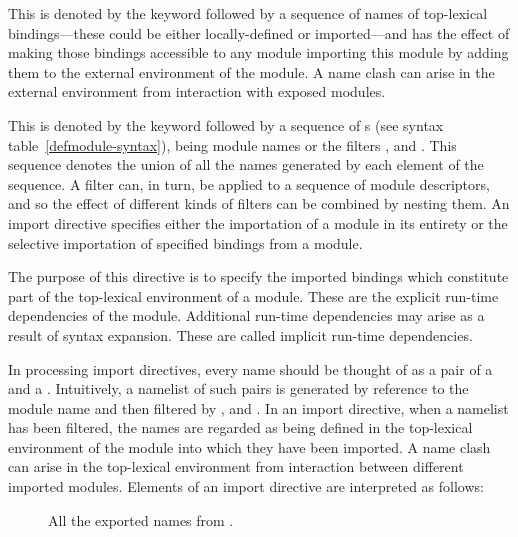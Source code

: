 %
%
\begin{optDefinition}
This is denoted by the keyword  followed by a sequence of
names of top-lexical bindings---these could be either locally-defined or
imported---and has the effect of making those bindings accessible to any module
importing this module by adding them to the external environment of the module.
A name clash can arise in the external environment from interaction with exposed
modules.
\end{optDefinition}
%
%
\label{import}
%
\begin{optDefinition}
This is denoted by the keyword  followed by a sequence of
s (see syntax table~\ref{defmodule-syntax}), being
module names or the filters ,  and
.  This sequence denotes the union of all the names generated
by each element of the sequence.  A filter can, in turn, be applied to a
sequence of module descriptors, and so the effect of different kinds of filters
can be combined by nesting them.  An import directive specifies either the
importation of a module in its entirety or the selective importation of
specified bindings from a module.

The purpose of this directive is to specify the imported bindings which
constitute part of the top-lexical environment of a module.  These are the
explicit run-time dependencies of the module.  Additional run-time dependencies
may arise as a result of syntax expansion.  These are called implicit run-time
dependencies.

In processing import directives, every name should be thought of as a pair of a
 and a .  Intuitively, a namelist of such
pairs is generated by reference to the module name and then filtered by
,  and .  In an import
directive, when a namelist has been filtered, the names are regarded as being
defined in the top-lexical environment of the module into which they have been
imported.  A name clash can arise in the top-lexical environment from
interaction between different imported modules.  Elements of an import directive
are interpreted as follows:
%
\begin{description}
    \item[] All the exported names from .


\end{description}
\end{optDefinition}

